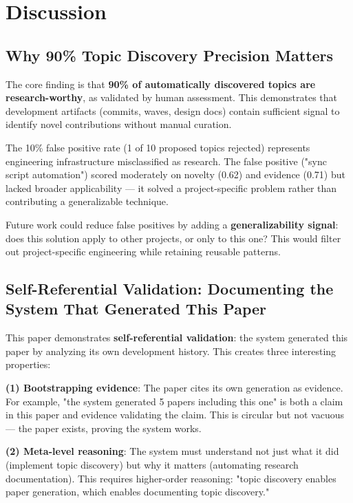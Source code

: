 \section{Discussion}
\label{sec:discussion}

\subsection{Why 90\% Topic Discovery Precision Matters}

The core finding is that \textbf{90\% of automatically discovered topics are research-worthy}, as validated by human assessment. This demonstrates that development artifacts (commits, waves, design docs) contain sufficient signal to identify novel contributions without manual curation.

The 10\% false positive rate (1 of 10 proposed topics rejected) represents engineering infrastructure misclassified as research. The false positive ("sync script automation") scored moderately on novelty (0.62) and evidence (0.71) but lacked broader applicability — it solved a project-specific problem rather than contributing a generalizable technique.

Future work could reduce false positives by adding a \textbf{generalizability signal}: does this solution apply to other projects, or only to this one? This would filter out project-specific engineering while retaining reusable patterns.

\subsection{Self-Referential Validation: Documenting the System That Generated This Paper}

This paper demonstrates \textbf{self-referential validation}: the system generated this paper by analyzing its own development history. This creates three interesting properties:

\textbf{(1) Bootstrapping evidence}: The paper cites its own generation as evidence. For example, "the system generated 5 papers including this one" is both a claim in this paper and evidence validating the claim. This is circular but not vacuous — the paper exists, proving the system works.

\textbf{(2) Meta-level reasoning}: The system must understand not just what it did (implement topic discovery) but why it matters (automating research documentation). This requires higher-order reasoning: "topic discovery enables paper generation, which enables documenting topic discovery."

